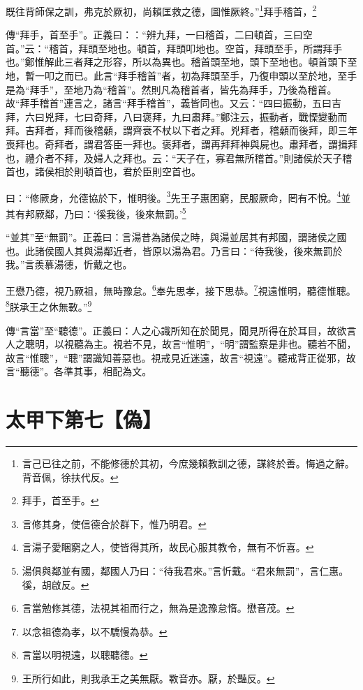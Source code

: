 既往背師保之訓，弗克於厥初，尚賴匡救之德，圖惟厥終。”\footnote{言己已往之前，不能修德於其初，今庶幾賴教訓之德，謀終於善。悔過之辭。背音佩，徐扶代反。}拜手稽首，\footnote{拜手，首至手。}

{\noindent\zhuan{}\fzbyks 傳“拜手，首至手”。正義曰：：“辨九拜，一曰稽首，二曰頓首，三曰空首。”云：“稽首，拜頭至地也。頓首，拜頭叩地也。空首，拜頭至手，所謂拜手也。”鄭惟解此三者拜之形容，所以為異也。稽首頭至地，頭下至地也。頓首頭下至地，暫一叩之而已。此言“拜手稽首”者，初為拜頭至手，乃復申頭以至於地，至手是為“拜手”，至地乃為“稽首”。然則凡為稽首者，皆先為拜手，乃後為稽首。故“拜手稽首”連言之，諸言“拜手稽首”，義皆同也。又云：“四曰振動，五曰吉拜，六曰兇拜，七曰奇拜，八曰褒拜，九曰肅拜。”鄭注云，振動者，戰慄變動而拜。吉拜者，拜而後稽顙，謂齊衰不杖以下者之拜。兇拜者，稽顙而後拜，即三年喪拜也。奇拜者，謂君答臣一拜也。褒拜者，謂再拜拜神與屍也。肅拜者，謂揖拜也，禮介者不拜，及婦人之拜也。云：“天子在，寡君無所稽首。”則諸侯於天子稽首也，諸侯相於則頓首也，君於臣則空首也。 \par}

曰：“修厥身，允德協於下，惟明後。\footnote{言修其身，使信德合於群下，惟乃明君。}先王子惠困窮，民服厥命，罔有不悅。\footnote{言湯子愛睏窮之人，使皆得其所，故民心服其教令，無有不忻喜。}並其有邦厥鄰，乃曰：‘徯我後，後來無罰。’\footnote{湯俱與鄰並有國，鄰國人乃曰：“待我君來。”言忻戴。“君來無罰”，言仁惠。徯，胡啟反。}

{\noindent\shu{}\fzkt “並其”至“無罰”。正義曰：言湯昔為諸侯之時，與湯並居其有邦國，謂諸侯之國也。此諸侯國人其與湯鄰近者，皆原以湯為君。乃言曰：“待我後，後來無罰於我。”言羨慕湯德，忻戴之也。 \par}

王懋乃德，視乃厥祖，無時豫怠。\footnote{言當勉修其德，法視其祖而行之，無為是逸豫怠惰。懋音茂。}奉先思孝，接下思恭。\footnote{以念祖德為孝，以不驕慢為恭。}視遠惟明，聽德惟聰。\footnote{言當以明視遠，以聰聽德。}朕承王之休無斁。”\footnote{王所行如此，則我承王之美無厭。斁音亦。厭，於豔反。}

{\noindent\zhuan{}\fzbyks 傳“言當”至“聽德”。正義曰：人之心識所知在於聞見，聞見所得在於耳目，故欲言人之聰明，以視聽為主。視若不見，故言“惟明”，“明”謂監察是非也。聽若不聞，故言“惟聰”，“聰”謂識知善惡也。視戒見近迷遠，故言“視遠”。聽戒背正從邪，故言“聽德”。各準其事，相配為文。 \par}

\section{太甲下第七【偽】}


